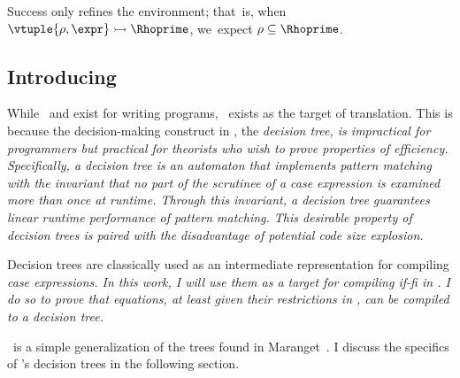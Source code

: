 \documentclass[manuscript,screen,review, 12pt, nonacm]{acmart}
\begin{document}
    \medskip
        
    Success only refines the environment; that~is, when ${\vtuple{\rho, \expr}}
    \rightarrowtail{} {\Rhoprime}$, we~expect $\rho \subseteq \Rhoprime$.
    
    \vfilbreak

\vmsemantics

\subsection{Introducing \D}
\label{d}

While \PPlus\ and \VMinus exist for writing programs, \D\ exists as the target
of translation. This is because the decision-making construct in \D, the
\it{decision tree}, is impractical for programmers but practical for theorists
who wish to prove properties of efficiency. Specifically, a decision tree is an
automaton that implements pattern matching with the invariant that no part of
the scrutinee of a \it{case} expression is examined more than once at runtime.
Through this invariant, a decision tree guarantees linear runtime performance of
pattern matching. This desirable property of decision trees is paired with the
disadvantage of potential code size explosion. 

Decision trees are classically used as an intermediate representation for
compiling \it{case} expressions. In this work, I will use them as a target for
compiling \it{if-fi} in \VMinus. I do so to prove that equations, at least given
their restrictions in \VMinus, can be compiled to a decision tree. 

\D\ is a simple generalization of the trees found in Maranget~\cite{maranget}. I
discuss the specifics of \D's decision trees in the following section. 
\end{document}
